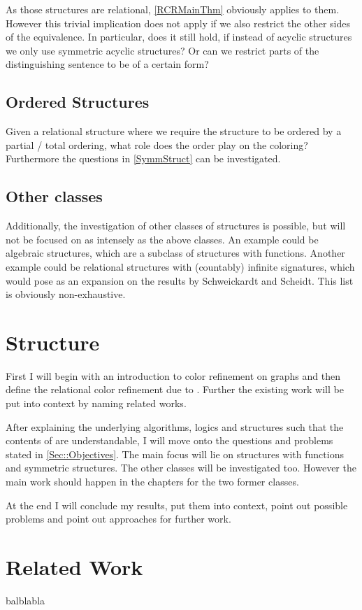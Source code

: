 \documentclass[a4paper,11pt,DIV=15]{scrartcl} %
\theoremstyle{plain}
\theoremstyle{definition}
\begin{document}
As those structures are relational, \cref{RCRMainThm} obviously applies to them.
However this trivial implication does not apply if we also restrict the other sides of the equivalence.
In particular, does it still hold, if instead of acyclic structures we only use symmetric acyclic structures?
Or can we restrict parts of the distinguishing sentence to be of a certain form?
\label{SymmStruct}

\subsection{Ordered Structures}

Given a relational structure where we require the structure to be ordered by a partial / total ordering, what role does the order play on the coloring?
Furthermore the questions in \cref{SymmStruct} can be investigated.

\subsection{Other classes}

Additionally, the investigation of other classes of structures is possible, but will not be focused on as intensely as the above classes.
An example could be algebraic structures, which are a subclass of structures with functions. Another example could be relational structures with (countably) infinite signatures, which would pose as an expansion on the results by Schweickardt and Scheidt.
This list is obviously non-exhaustive.

\section{Structure}

First I will begin with an introduction to color refinement on graphs and then define the relational color refinement due to \cite{scheidt2024color}.
Further the existing work will be put into context by naming related works.

After explaining the underlying algorithms, logics and structures such that the contents of \cite{scheidt2024color} are understandable, I will move onto the questions and problems stated in \cref{Sec::Objectives}.
The main focus will lie on structures with functions and symmetric structures.
The other classes will be investigated too. However the main work should happen in the chapters for the two former classes.

At the end I will conclude my results, put them into context, point out possible problems and point out approaches for further work.


\section{Related Work}

balblabla



\end{document}

